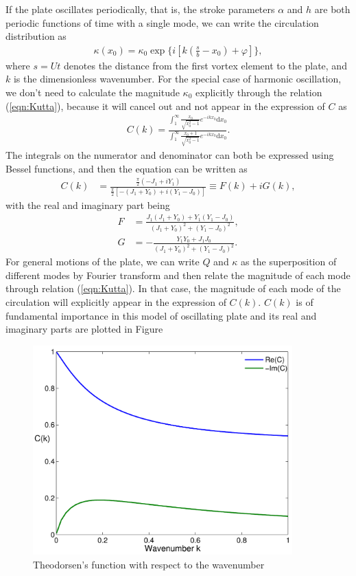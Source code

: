 If the plate oscillates periodically, that is, the stroke parameters $\alpha$ and $h$ are both periodic functions of time with a single mode, we can write the circulation distribution as
\begin{align}
\kappa(x_0) = \kappa_0 \exp \{i[k(\frac{s}{b}-x_0)+ \varphi] \},
\end{align}
where $s = Ut$ denotes the distance from the first vortex element to the plate, and $k$ is the dimensionless wavenumber.
For the special case of harmonic oscillation, we don't need to calculate the magnitude $\kappa_0$ explicitly through the relation (\ref{eqn:Kutta}), because it will cancel out and not appear in the expression of $C$ as
\begin{align}
C(k) = \frac{\int_{1}^{\infty} \frac{x_0}{\sqrt{x_0^2-1}} e^{-ikx_0} \mathrm{d}x_0}{\int_{1}^{\infty} \frac{x_0+1}{\sqrt{x_0^2-1}} e^{-ikx_0} \mathrm{d}x_0}.
\end{align}
The integrals on the numerator and denominator can both be expressed using Bessel functions, and then the equation can be written as
\begin{align}
C(k) & =  \frac{\frac{\pi}{2}(-J_1+iY_1)}{\frac{\pi}{2}[-(J_1+Y_0)+i(Y_1-J_0)]}
          \equiv  F(k) + iG(k),
\end{align}
with the real and imaginary part being
\begin{align}
F & = \frac{J_1(J_1+Y_0)+Y_1(Y_1-J_0)}{(J_1+Y_0)^2+(Y_1-J_0)^2},  \\
G & = -\frac{Y_1Y_0+J_1J_0}{(J_1+Y_0)^2+(Y_1-J_0)^2}.
\end{align}
For general motions of the plate, we can write $Q$  and $\kappa$ as the superposition of different modes by Fourier transform and then relate the magnitude of each mode through relation (\ref{eqn:Kutta}). In that case, the magnitude of each mode of the circulation will explicitly appear in the expression of $C(k)$.
$C(k)$ is of fundamental importance in this model of oscillating plate and its real and imaginary parts are plotted in Figure

\begin{figure}
 \centering
 \includegraphics[width=10cm]{Figures/theodorsen/TheodorsenFunction.pdf}
\caption{Theodorsen's function with respect to the wavenumber}
\label{fig:TheodorsenFunction}
\end{figure}


